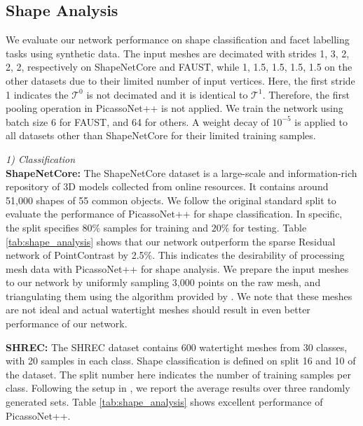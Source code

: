 \vspace{-2mm}
\subsection{Shape Analysis}
\label{sec:synthetic_data}
We evaluate our network performance on shape classification and facet labelling tasks using synthetic data. The input meshes are decimated with strides 1, 3, 2, 2, 2, respectively on ShapeNetCore and FAUST, while 1, 1.5, 1.5, 1.5, 1.5 on the other datasets due to their limited number of input vertices. 
Here, the first stride 1 indicates the $\mathcal{T}^0$ is not decimated and it is identical to $\mathcal{T}^1$. Therefore, the first pooling operation in PicassoNet++ is not applied.
We train the network using batch size 6 for FAUST, and 64 for others. A weight decay of $10^{-5}$ is applied to all datasets other than ShapeNetCore for their limited training samples.

\vspace{1mm}
\noindent\textit{1) Classification}
\vspace{1mm}\\
\noindent\textbf{ShapeNetCore:} The ShapeNetCore dataset \cite{chang2015shapenet} is a large-scale and information-rich repository of 3D models collected from online  resources. It contains around 51,000
shapes of 55 common objects. We follow the original standard split to evaluate the performance of PicassoNet++ for shape classification. In specific, the split specifies $80\%$ samples for training and $20\%$ for testing. Table \ref{tab:shape_analysis} shows that our network outperform the sparse Residual network of PointContrast \cite{xie2020pointcontrast} by 2.5\%.
This indicates the desirability of processing mesh data with  PicassoNet++ for shape analysis. We prepare the input meshes to our network by uniformly sampling 3,000 points on the raw mesh, and triangulating them using the algorithm provided by \cite{pointcloud2mesh}. 
We note that these meshes are not ideal and actual watertight meshes should result in even better performance of our network. 

\vspace{1mm}
\noindent\textbf{SHREC:} The SHREC dataset \cite{lian2011shape, hanocka2019meshcnn} contains 600 watertight meshes from 30 classes, with 20 samples in each class. Shape classification is defined on split 16 and 10 of the dataset. The split number here indicates the number of training samples  per class. Following the setup in \cite{hanocka2019meshcnn}, we report the average results over three randomly generated sets. Table \ref{tab:shape_analysis} shows excellent performance of PicassoNet++.

